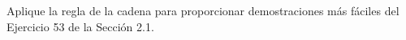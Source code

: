 \item Aplique la regla de la cadena para proporcionar demostraciones más fáciles del Ejercicio 53 de la Sección 2.1.

